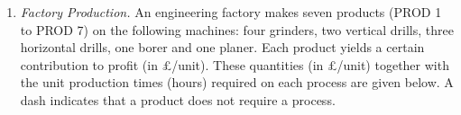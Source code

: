 \documentclass[12pt,a4paper]{article}
\theoremstyle{definition}
\begin{document}
\begin{enumerate}
\begin{enumerate}

    \end{enumerate}
    \item
    \textit{Factory Production.} An engineering factory makes seven products (PROD 1 to PROD 7) on the following machines: four grinders, two vertical drills, three horizontal drills, one borer and one planer. Each product yields a certain contribution to profit (in \pounds/unit). These quantities (in \pounds/unit) together with the unit production times (hours) required on each process are given below. A dash indicates that a product does not require a process.


\end{enumerate}
\end{document}

